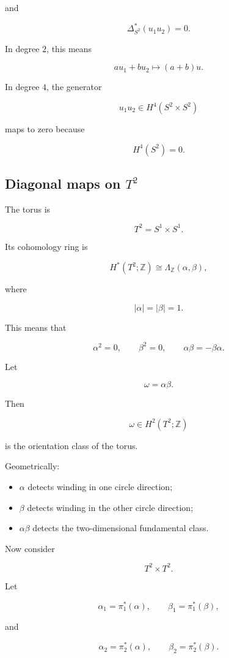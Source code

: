 \documentclass[12pt,a4paper]{article}
\theoremstyle{notespace}
\begin{document}
and

\[
\boxed{
	\Delta_{S^2}^*(u_1u_2)=0.
}
\]

In degree \(2\), this means

\[
au_1+bu_2
\longmapsto
(a+b)u.
\]

In degree \(4\), the generator

\[
u_1u_2\in H^4(S^2\times S^2)
\]

maps to zero because

\[
H^4(S^2)=0.
\]

\subsection{Diagonal maps on \(T^2\)}

The torus is

\[
T^2=S^1\times S^1.
\]

Its cohomology ring is

\[
H^*(T^2;\mathbb Z)
\cong
\Lambda_{\mathbb Z}(\alpha,\beta),
\]

where

\[
|\alpha|=|\beta|=1.
\]

This means that

\[
\alpha^2=0,
\qquad
\beta^2=0,
\qquad
\alpha\beta=-\beta\alpha.
\]

Let

\[
\omega=\alpha\beta.
\]

Then

\[
\omega\in H^2(T^2;\mathbb Z)
\]

is the orientation class of the torus.

Geometrically:

\begin{itemize}
	\item \(\alpha\) detects winding in one circle direction;
	\item \(\beta\) detects winding in the other circle direction;
	\item \(\alpha\beta\) detects the two-dimensional fundamental class.
\end{itemize}

Now consider

\[
T^2\times T^2.
\]

Let

\[
\alpha_1=\pi_1^*(\alpha),
\qquad
\beta_1=\pi_1^*(\beta),
\]

and

\[
\alpha_2=\pi_2^*(\alpha),
\qquad
\beta_2=\pi_2^*(\beta).
\]
\end{document}

